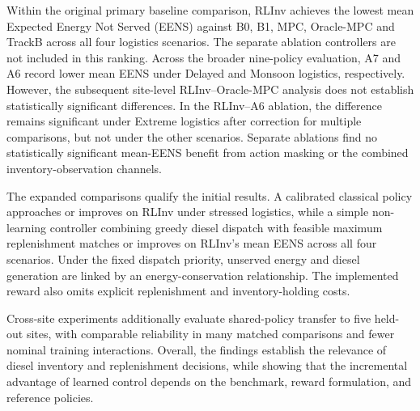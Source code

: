 \begin{doublespacing}
\begin{revisedblock}
Within the original primary baseline comparison,
RLInv achieves the lowest mean Expected Energy
Not Served (EENS) against B0, B1, MPC,
Oracle-MPC and TrackB across all four logistics
scenarios. The separate ablation controllers
are not included in this ranking. Across the broader nine-policy evaluation,
A7 and A6 record lower mean EENS under
Delayed and Monsoon logistics, respectively. However,
the subsequent site-level RLInv--Oracle-MPC analysis
does not establish statistically significant
differences. In the RLInv--A6 ablation, the
difference remains significant under Extreme
logistics after correction for multiple comparisons,
but not under the other scenarios. Separate
ablations find no statistically significant
mean-EENS benefit from action masking or the
combined inventory-observation channels.

The expanded comparisons qualify the initial
results. A calibrated classical policy approaches
or improves on RLInv under stressed logistics,
while a simple non-learning controller combining
greedy diesel dispatch with feasible maximum
replenishment matches or improves on RLInv's mean
EENS across all four scenarios. Under the fixed
dispatch priority, unserved energy and diesel
generation are linked by an energy-conservation
relationship. The implemented reward also omits
explicit replenishment and inventory-holding costs.

Cross-site experiments additionally evaluate
shared-policy transfer to five held-out sites,
with comparable reliability in many matched
comparisons and fewer nominal training interactions.
Overall, the findings establish the relevance
of diesel inventory and replenishment decisions,
while showing that the incremental advantage of
learned control depends on the benchmark,
reward formulation, and reference policies.
\end{revisedblock}

\end{doublespacing}